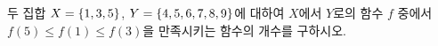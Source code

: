 두 집합 $X=\{1{,}\mkern3mu\mathopen{}3{,}\mkern3mu\mathopen{}5\}$, $Y=\{4{,}\mkern3mu\mathopen{}5{,}\mkern3mu\mathopen{}6{,}\mkern3mu\mathopen{}7{,}\mkern3mu\mathopen{}8{,}\mkern3mu\mathopen{}9\}$에 대하여 $X$에서 $Y$로의 함수 $f$ 중에서 $f(5)\le f(1)\le f(3)$을 만족시키는 함수의 개수를 구하시오.
